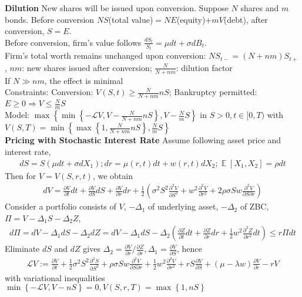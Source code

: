 \documentclass[12pt,landscape, a4paper]{article}
\theoremstyle{remark}
\newcommand{\E}{\operatorname{\mathbb{E}}}
\newcommand{\dd}{\partial}
\begin{document}
\begin{multicols*}{3}
\textbf{Dilution} New shares will be issued upon conversion. Suppose $N$ shares and $m$ bonds. Before conversion $NS$(total value)$= NE$(equity)$+ mV$(debt), after conversion, $S = E$.\\
Before conversion, firm's value follows $\frac{d S_t}{S_t} = \mu dt + \sigma d B_t$.
\\Firm's total worth remains unchanged upon conversion: $NS_{t-} = (N+ nm) S_{t+}$, $nm$: new shares issued after conversion; $\frac{N}{N +nm}$: dilution factor\\
If $N \gg nm$, the effect is minimal\\
Constraints: Conversion: $V(S, t) \geq \frac{N}{N +nm} nS$; Bankruptcy permitted: $E \geq 0 \Rightarrow V \leq \frac{N}{m} S$\\
Model: $\max \left\{\min \left\{-\mathcal{L} V, V - \frac{N}{N+nm}nS \right\}, V - \frac{N}{m}S \right\}$ in $S>0, t \in [0, T)$ with $V(S, T) = \min \left\{ \max \left\{1, \frac{N}{N+nm}nS \right\}, \frac{N}{m}S \right\}$\\

\textbf{Pricing with Stochastic Interest Rate} Assume following asset price and interest rate,
\begin{align*}
    dS = S (\mu dt + \sigma dX_1) ; dr = \mu(r, t) dt + w (r, t) dX_2; \E [X_1, X_2] = \rho dt
\end{align*}
Then for $V = V(S, r, t)$, we obtain
\begin{align*}
    dV = \frac{\dd V}{\dd t} dt + \frac{\dd V}{\dd S} dS + \frac{\dd V}{\dd r} dr + \frac{1}{2} \left(\sigma^2 S^2 \frac{\dd^2 V}{\dd S^2} + w^2 \frac{\dd^2 V}{\dd r^2} + 2\rho \sigma S w \frac{\dd^2 V}{\dd S \dd r} \right)
\end{align*}
Consider a portfolio consists of $V$, $-\Delta_1$ of underlying asset, $-\Delta_2$ of ZBC, $\Pi = V - \Delta_1 S - \Delta_2 Z$,
\begin{align*}
    d\Pi = d V - \Delta_1 d S - \Delta_2 d Z = dV - \Delta_1 d S - \Delta_2 \left(\frac{\dd Z}{\dd t} dt + \frac{\dd Z}{\dd r} dr + \frac{1}{2} w^2 \frac{\dd^2 Z}{\dd r^2} dt \right) \leq r\Pi dt
\end{align*}
Eliminate $d S$ and $d Z$ gives $\Delta_2 = \frac{\dd V}{\dd r} / \frac{\dd Z}{\dd r}, \Delta_1 = \frac{\dd V}{\dd S}$, hence
\begin{align*}
    \mathcal{L}V := \frac{\dd V}{\dd t} + \frac{1}{2} \sigma^2 S^2 \frac{\dd^2 S}{\dd S^2} + \rho \sigma S w \frac{\dd^2 V}{\dd S \dd r } + \frac{1}{2} w^2 \frac{\dd^2 V}{\dd r^2} + rS \frac{\dd V}{\dd S} + (\mu - \lambda w) \frac{\dd V}{\dd r} - rV
\end{align*}
with variational inequalities $\min \left\{-\mathcal{L} V, V - nS \right\} = 0, V(S, r, T) = \max \left\{1, nS \right\}$
\\


\end{multicols*}
\end{document}
